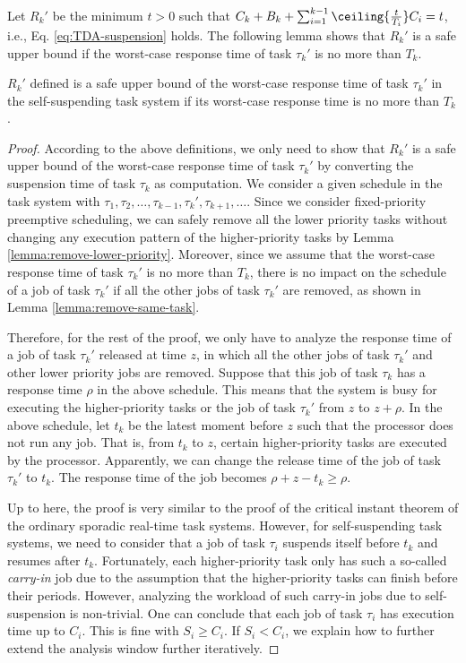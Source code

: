 Let $R_k'$ be the minimum $t > 0$ such that  $C_k + B_k + \sum_{i=1}^{k-1}\ceiling{\frac{t}{T_i}} C_i = t$, i.e., Eq. \ref{eq:TDA-suspension} holds. The following lemma shows that $R_k'$ is a safe upper bound if the worst-case response time of task $\tau_k'$ is no more than $T_k$.

\begin{lemma}
\label{lemma:critical}
 $R_k'$ defined is a safe upper bound of the worst-case response time of task $\tau_k'$ in the self-suspending task system if its worst-case response time is no more than $T_k$.
\end{lemma}
\begin{proof}
According to the above definitions, we only need to show that $R_k'$ is a safe upper bound of the worst-case response time of task $\tau_k'$ by converting the suspension time of task $\tau_k$ as computation. We consider a given schedule in the task system with $\tau_1, \tau_2, \ldots, \tau_{k-1}, \tau_k', \tau_{k+1}, \ldots$. Since we consider fixed-priority preemptive scheduling, we can safely remove all the lower priority tasks without changing any execution pattern of the higher-priority tasks by Lemma \ref{lemma:remove-lower-priority}. Moreover, since we assume that the worst-case response time of task $\tau_k'$ is no more than $T_k$, there is no impact on the schedule of a job of task $\tau_k'$ if all the other jobs of task $\tau_k'$ are removed, as shown in Lemma \ref{lemma:remove-same-task}. 


Therefore, for the rest of the proof, we only have to analyze the response time of a job of task $\tau_k'$ released at time $z$, in which all the other jobs of task $\tau_k'$ and other lower priority jobs are removed. Suppose that this job of task $\tau_k$ has a response time $\rho$ in the above schedule. This means that the system is busy for executing the higher-priority tasks or the job of task $\tau_k'$ from $z$ to $z+\rho$. In the above schedule, let $t_{k}$ be the latest moment before $z$ such that the processor does not run any job. That is, from $t_k$ to $z$, certain higher-priority tasks are executed by the processor. Apparently, we can change the release time of the job of task $\tau_k'$ to $t_k$. The response time of the job becomes $\rho+z-t_k \geq \rho$. 

Up to here, the proof is very similar to the proof of the critical instant theorem of the ordinary sporadic real-time task systems. However, for self-suspending task systems, we need to consider that a job of task $\tau_i$ suspends itself before $t_k$ and resumes after $t_k$.  Fortunately, each higher-priority task only has such a so-called \emph{carry-in} job due to the assumption that the higher-priority tasks can finish before their periods. However, analyzing the workload of such carry-in jobs due to self-suspension is non-trivial. One can conclude that each job of task $\tau_i$ has execution time up to $C_i$. This is fine with $S_i \geq C_i$. If $S_i < C_i$, we explain how to further extend the analysis window further iteratively. 



\end{proof}
